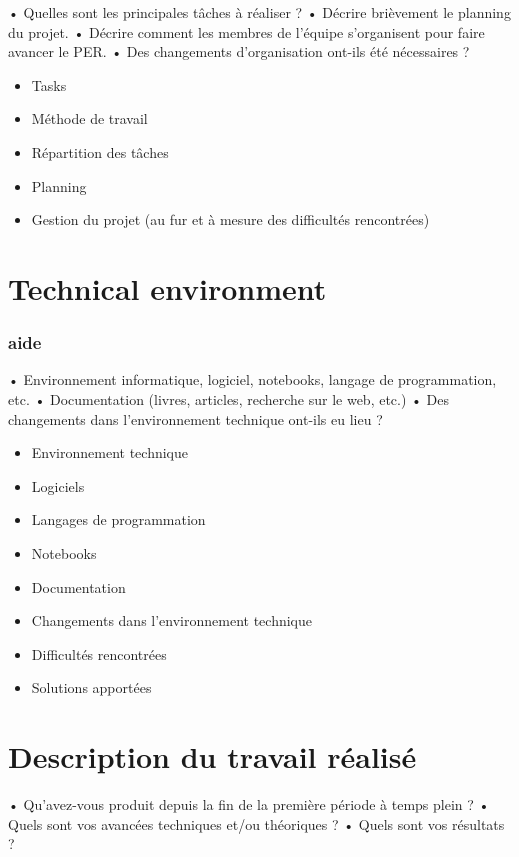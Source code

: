 \documentclass[11pt]{article}
\begin{document}
•	Quelles sont les principales tâches à réaliser ?
•	Décrire brièvement le planning du projet.
•	Décrire comment les membres de l’équipe s’organisent pour faire avancer le PER. 
•	Des changements d’organisation ont-ils été nécessaires ?


\begin{itemize}
  \item Tasks
  \item Méthode de travail
  \item Répartition des tâches
  \item Planning
  \item Gestion du projet (au fur et à mesure des difficultés rencontrées)
\end{itemize}

\pagebreak

\section{Technical environment}

\subsubsection*{aide}

•	Environnement informatique, logiciel, notebooks, langage de programmation, etc.
•	Documentation (livres, articles, recherche sur le web, etc.)
•	Des changements dans l’environnement technique ont-ils eu lieu ?

\begin{itemize}
  \item Environnement technique
  \item Logiciels
  \item Langages de programmation
  \item Notebooks
  \item Documentation
  \item Changements dans l'environnement technique
  \item Difficultés rencontrées
  \item Solutions apportées
\end{itemize}

\pagebreak

\section{Description du travail réalisé}

•	Qu’avez-vous produit depuis la fin de la première période à temps plein ?
•	Quels sont vos avancées techniques et/ou théoriques ?
•	Quels sont vos résultats ?
\end{document}
